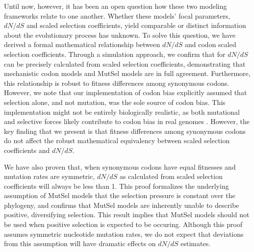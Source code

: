 \documentclass{pnastwo}
\begin{document}
\begin{article}
Until now, however, it has been an open question how these two modeling frameworks relate to one another. Whether these models' focal parameters, $dN/dS$ and scaled selection coefficients, yield comparable or distinct information about the evolutionary process has unknown. To solve this question, we have derived a formal mathematical relationship between $dN/dS$ and codon scaled selection coefficients. Through a simulation approach, we confirm that for $dN/dS$ can be precisely calculated from scaled selection coefficients, demonstrating that mechanistic codon models and MutSel models are in full agreement. Furthermore, this relationship is robust to fitness differences among synonymous codons. However, we note that our implementation of codon bias explicitly assumed that selection alone, and not mutation, was the sole source of codon bias. This implementation might not be entirely biologically realistic, as both mutational and selective forces likely contribute to codon bias in real genomes \cite{Blumer1991, Duret2002, HershbergPetrov2008, Chen2009, PlotkinKudla2010}. However, the key finding that we present is that fitness differences among synonymous codons do not affect the robust mathematical equivalency between scaled selection coefficients and $dN/dS$. 

We have also proven that, when synonymous codons have equal fitnesses and mutation rates are symmetric, $dN/dS$ as calculated from scaled selection coefficients will always be less than 1. This proof formalizes the underlying assumption of MutSel models that the selection pressure is constant over the phylogeny, and confirms that MutSel models are inherently unable to describe positive, diversifying selection. This result implies that MutSel models should not be used when positive selection is expected to be occuring. Although this proof assumes symmetric nucleotide mutation rates, we do not expect that deviations from this assumption will have dramatic effects on $dN/dS$ estimates. 


\end{article}
\end{document}
